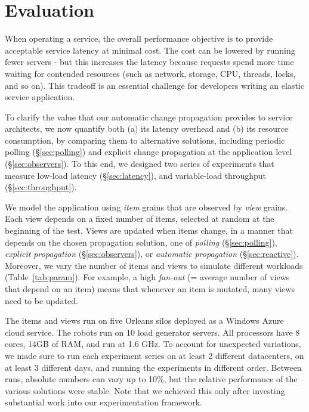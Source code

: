\section{Evaluation}

When operating a service, the overall performance objective is to provide acceptable service latency at minimal cost. The cost can be lowered by running fewer servers - but this increases the latency because requests spend more time waiting for contended resources (such as network, storage, CPU, threads, locks, and so on). This tradeoff is an essential challenge for developers writing an elastic service application. 

To clarify the value that our automatic change propagation provides to service architects, we now quantify both (a) its latency overhead and (b) its resource consumption, by comparing them to alternative solutions, including periodic polling (\S\ref{sec:polling}) and explicit change propagation at the application level (\S\ref{sec:observers}). To this end, we designed two series of experiments that measure low-load latency (\S\ref{sec:latency}), and variable-load throughput (\S\ref{sec:throughput}).

We model the application using  \emph{item} grains that are observed by \emph{view} grains. Each view depends on a fixed number of items, selected at random at the beginning of the test. Views are updated when items change, in a manner that depends on the chosen propagation solution, one of \emph{polling} (\S\ref{sec:polling}), \emph{explicit propagation} (\S\ref{sec:observers}), or \emph{automatic propagation} (\S\ref{sec:reactive}). Moreover, we vary the number of items and views to simulate different workloads (Table~\ref{tab:param}).  For example, a high \emph{fan-out} (= average number of views that depend on an item) means that whenever an item is mutated, many views need to be updated.  

 
The items and views run on five Orleans silos deployed as a Windows Azure cloud service. The robots run on 10 load generator servers. All processors have 8 cores, 14GB of RAM, and run at 1.6 GHz. To account for unexpected variations, we made sure to run each experiment series on at least 2 different datacenters, on at least 3 different days, and running the experiments in different order. Between runs, absolute numbers can vary up to 10\%, but the relative performance of the various solutions were stable. Note that we achieved this only after investing substantial work into our experimentation framework. 


